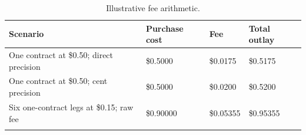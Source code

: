 \begin{table}[htbp]\centering
{\fontsize{10}{12}\selectfont\renewcommand{\arraystretch}{1.18}\setlength{\tabcolsep}{4pt}
\begin{tabularx}{\linewidth}{@{}L{77mm}C{27mm}C{26mm}X@{}}\toprule{}
\textbf{Scenario} & \textbf{Purchase cost} & \textbf{Fee} & \textbf{Total outlay} \\ \midrule
One contract at \$0.50; direct precision & \$0.5000 & \$0.0175 & \$0.5175 \\ \hline
One contract at \$0.50; cent precision & \$0.5000 & \$0.0200 & \$0.5200 \\ \hline
Six one-contract legs at \$0.15; raw fee & \$0.90000 & \$0.05355 & \$0.95355 \\ \hline
{}\bottomrule\end{tabularx}}
\caption[Illustrative fee arithmetic]{Illustrative fee arithmetic.}\label{tab:fees}
\end{table}
